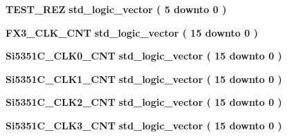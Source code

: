 \begin{DoxyCompactItemize}
\item 
{\bf T\+E\+S\+T\+\_\+\+R\+EZ} {\bfseries {\bfseries \textcolor{comment}{std\+\_\+logic\+\_\+vector}\textcolor{vhdlchar}{ }\textcolor{vhdlchar}{(}\textcolor{vhdlchar}{ }\textcolor{vhdlchar}{ } \textcolor{vhdldigit}{5} \textcolor{vhdlchar}{ }\textcolor{keywordflow}{downto}\textcolor{vhdlchar}{ }\textcolor{vhdlchar}{ } \textcolor{vhdldigit}{0} \textcolor{vhdlchar}{ }\textcolor{vhdlchar}{)}\textcolor{vhdlchar}{ }}} 
\item 
{\bf F\+X3\+\_\+\+C\+L\+K\+\_\+\+C\+NT} {\bfseries {\bfseries \textcolor{comment}{std\+\_\+logic\+\_\+vector}\textcolor{vhdlchar}{ }\textcolor{vhdlchar}{(}\textcolor{vhdlchar}{ }\textcolor{vhdlchar}{ } \textcolor{vhdldigit}{15} \textcolor{vhdlchar}{ }\textcolor{keywordflow}{downto}\textcolor{vhdlchar}{ }\textcolor{vhdlchar}{ } \textcolor{vhdldigit}{0} \textcolor{vhdlchar}{ }\textcolor{vhdlchar}{)}\textcolor{vhdlchar}{ }}} 
\item 
{\bf Si5351\+C\+\_\+\+C\+L\+K0\+\_\+\+C\+NT} {\bfseries {\bfseries \textcolor{comment}{std\+\_\+logic\+\_\+vector}\textcolor{vhdlchar}{ }\textcolor{vhdlchar}{(}\textcolor{vhdlchar}{ }\textcolor{vhdlchar}{ } \textcolor{vhdldigit}{15} \textcolor{vhdlchar}{ }\textcolor{keywordflow}{downto}\textcolor{vhdlchar}{ }\textcolor{vhdlchar}{ } \textcolor{vhdldigit}{0} \textcolor{vhdlchar}{ }\textcolor{vhdlchar}{)}\textcolor{vhdlchar}{ }}} 
\item 
{\bf Si5351\+C\+\_\+\+C\+L\+K1\+\_\+\+C\+NT} {\bfseries {\bfseries \textcolor{comment}{std\+\_\+logic\+\_\+vector}\textcolor{vhdlchar}{ }\textcolor{vhdlchar}{(}\textcolor{vhdlchar}{ }\textcolor{vhdlchar}{ } \textcolor{vhdldigit}{15} \textcolor{vhdlchar}{ }\textcolor{keywordflow}{downto}\textcolor{vhdlchar}{ }\textcolor{vhdlchar}{ } \textcolor{vhdldigit}{0} \textcolor{vhdlchar}{ }\textcolor{vhdlchar}{)}\textcolor{vhdlchar}{ }}} 
\item 
{\bf Si5351\+C\+\_\+\+C\+L\+K2\+\_\+\+C\+NT} {\bfseries {\bfseries \textcolor{comment}{std\+\_\+logic\+\_\+vector}\textcolor{vhdlchar}{ }\textcolor{vhdlchar}{(}\textcolor{vhdlchar}{ }\textcolor{vhdlchar}{ } \textcolor{vhdldigit}{15} \textcolor{vhdlchar}{ }\textcolor{keywordflow}{downto}\textcolor{vhdlchar}{ }\textcolor{vhdlchar}{ } \textcolor{vhdldigit}{0} \textcolor{vhdlchar}{ }\textcolor{vhdlchar}{)}\textcolor{vhdlchar}{ }}} 
\item 
{\bf Si5351\+C\+\_\+\+C\+L\+K3\+\_\+\+C\+NT} {\bfseries {\bfseries \textcolor{comment}{std\+\_\+logic\+\_\+vector}\textcolor{vhdlchar}{ }\textcolor{vhdlchar}{(}\textcolor{vhdlchar}{ }\textcolor{vhdlchar}{ } \textcolor{vhdldigit}{15} \textcolor{vhdlchar}{ }\textcolor{keywordflow}{downto}\textcolor{vhdlchar}{ }\textcolor{vhdlchar}{ } \textcolor{vhdldigit}{0} \textcolor{vhdlchar}{ }\textcolor{vhdlchar}{)}\textcolor{vhdlchar}{ }}} 

\end{DoxyCompactItemize}
